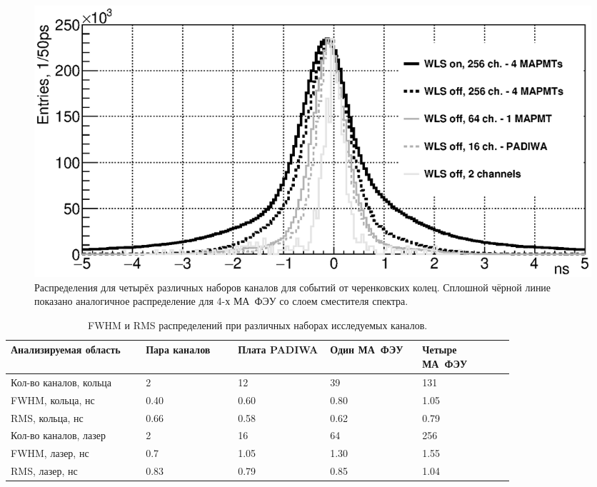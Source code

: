 \begin{figure}[H]
\centering
\includegraphics[width=1.0\textwidth]{pictures/Time_precision_evolution_rings_5_bw_17Mar2017.eps}
\caption{Распределения для четырёх различных наборов каналов для событий от черенковских колец. Сплошной чёрной линие показано аналогичное распределение для 4-х МА~ФЭУ со слоем сместителя спектра.}
\label{fig:TimeResEvolutionRings}
\end{figure}



\begin{table}[H]
\caption{FWHM и RMS распределений при различных наборах исследуемых каналов.}
\label{tabl:EvolutionParams}
\begin{tabular}{ | p{0.22\linewidth} | p{0.15\linewidth} | p{0.15\linewidth} | p{0.15\linewidth} | p{0.15\linewidth} | }
	\hline
	\scriptsize{Анализируемая область} & \scriptsize{Пара каналов} & \scriptsize{Плата PADIWA} & \scriptsize{Один МА~ФЭУ} & \scriptsize{Четыре МА~ФЭУ} \\
	\hline \hline
	\scriptsize{Кол-во каналов, кольца} & 2 & 12 & 39 & 131 \\
	\hline
	\scriptsize{FWHM, кольца, нс} & 0.40 & 0.60 & 0.80 & 1.05 \\
	\hline
	\scriptsize{RMS, кольца, нс} & 0.66 & 0.58 & 0.62 & 0.79 \\
	\hline \hline
	\scriptsize{Кол-во каналов, лазер} & 2 & 16 & 64 & 256 \\
	\hline
	\scriptsize{FWHM, лазер, нс} & 0.7 & 1.05 & 1.30 & 1.55 \\
	\hline
	\scriptsize{RMS, лазер, нс} & 0.83 & 0.79 & 0.85 & 1.04 \\
	\hline
\end{tabular}
\end{table}
